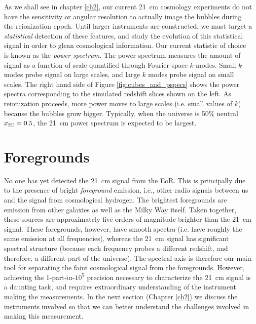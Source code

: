 As we shall see in chapter \ref{ch2}, our current 21\ cm cosmology experiments do not have the
sensitivity or angular resolution to actually image the bubbles during the reionization
epoch.  Until larger instruments are constructed, we must target a \emph{statistical} detection of these
features, and study the evolution of this statistical signal in order to glean cosmological information.
Our current statistic of choice is known as the \emph{power spectrum}.  The power spectrum
measures the amount of signal as a function of scale quantified through Fourier space $k$-modes.
Small $k$ modes probe signal on large scales, and large $k$ modes probe signal on small scales.
The right hand side of Figure \ref{fig:cubes_and_pspecs} shows the power spectra corresponding to the
simulated redshift slices shown on the left.  As reionization proceeds, more power moves to large scales (i.e. small values
of $k$) because the bubbles grow bigger.  Typically, when the universe is 50\% neutral $x_{\rm HI} = 0.5$, the
21\ cm power spectrum is expected to be largest.

\section{Foregrounds}

No one has yet detected the 21\ cm signal from the EoR.  This is principally due to the presence of bright
\emph{foreground} emission, i.e., other radio signals between us and the signal from cosmological hydrogen.
The brightest foregrounds are emission from other galaxies as well as the Milky Way itself.  Taken together, 
these sources are approximately five orders of magnitude brighter than the 21\ cm signal.  These foregrounds,
however, have smooth spectra (i.e. have roughly the same emission at all frequencies), whereas the 21\ cm signal
has significant spectral structure (because each frequency probes a different redshift, and therefore, a different
part of the universe).  The spectral axis is therefore our main tool for separating the faint
cosmological signal from the foregrounds.  However, achieving the 1-part-in-$10^5$ precision necessary to
characterize the 21\ cm signal is a daunting task, and requires extraordinary understanding of the instrument
making the measurements.  In the next section (Chapter \ref{ch2}) we discuss the instruments involved so that we
can better understand the challenges involved in making this measurement.
